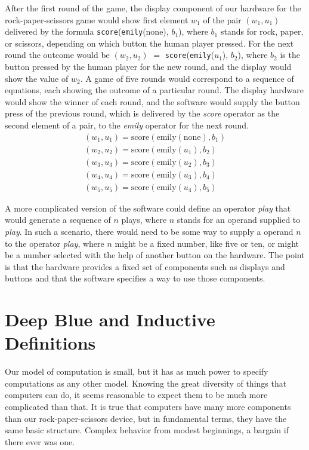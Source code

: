 After the first round of the game, the display component of our hardware
for the rock-paper-scissors game
would show first element $w_1$ of the pair $(w_1, u_1)$ delivered by the formula
\texttt{score}(\texttt{emily}(none), $b_1$),
where $b_1$ stands for rock, paper, or scissors, depending on which button
the human player pressed.
For the next round the outcome would be
$(w_2, u_2)$ $=$ \texttt{score}(\texttt{emily}($u_1$), $b_2$),
where $b_2$ is the button pressed by the human player for the new round,
and the display would show the value of $w_2$.
A game of five rounds would correspond to a sequence of equations,
each showing the outcome of a particular round.
The display hardware would show the winner of each round,
and the software would supply the button press of the previous round, which
is delivered by the \textit{score} operator as the second
element of a pair, to the \textit{emily} operator for the next round.
\begin{displaymath}
        \begin{array}{ll}
        (w_1, u_1) = \mbox{score}(\mbox{emily}(\mbox{none}), b_1) \\
        (w_2, u_2) = \mbox{score}(\mbox{emily}(u_1), b_2) \\
        (w_3, u_3) = \mbox{score}(\mbox{emily}(u_2), b_3) \\
        (w_4, u_4) = \mbox{score}(\mbox{emily}(u_3), b_4) \\
        (w_5, u_5) = \mbox{score}(\mbox{emily}(u_4), b_5)
        \end{array}
\end{displaymath}

A more complicated version of the software
could define an operator \textit{play} that would
generate a sequence of $n$ plays, where $n$ stands for
an operand supplied to \textit{play}.
In such a scenario, there would need to be some way to supply a operand $n$
to the operator \textit{play}, where $n$
might be a fixed number, like five or ten, or
might be a number selected with the help of another button on the hardware.
The point is that the hardware provides a fixed set of
components such as displays and buttons and that the software
specifies a way to use those components.

\section{Deep Blue and Inductive Definitions}

Our model of computation is small, but it has as much power to specify computations
as any other model. Knowing the great diversity of things that computers can do,
it seems reasonable to expect them to be much more complicated than that.
It is true that computers have many more components than our
rock-paper-scissors device, but in fundamental terms,
they have the same basic structure.
Complex behavior from modest beginnings, a bargain if there ever was one.

